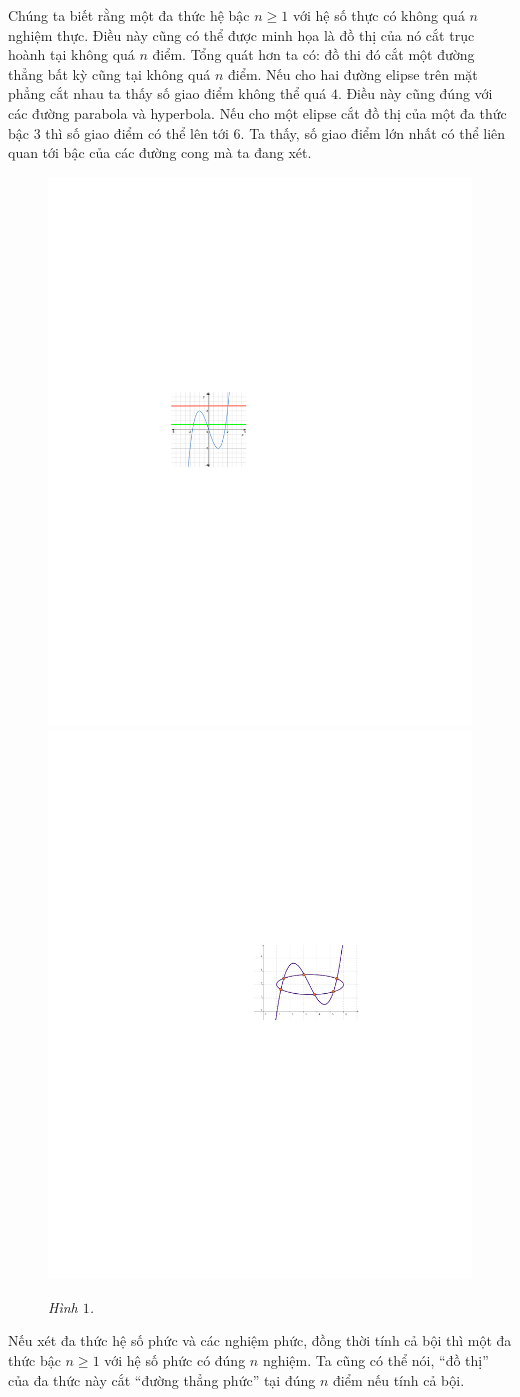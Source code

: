 \begin{multicols}{2}	
	Chúng ta biết rằng một đa thức hệ bậc $n\geq 1$ với hệ số thực có không quá $n$ nghiệm thực. Điều này cũng có thể được minh họa là đồ thị của nó cắt trục hoành tại không quá $n$ điểm. Tổng quát hơn ta có: đồ thi  đó cắt một đường thẳng bất kỳ cũng tại không quá $n$ điểm. 
	\vskip 0.1cm
	Nếu cho hai đường elipse trên mặt phẳng cắt nhau ta thấy số giao điểm không thể quá $4$. Điều này cũng đúng với các đường parabola và hyperbola.
	\vskip 0.1cm
	Nếu cho một elipse cắt đồ thị của một đa thức bậc $3$ thì số giao điểm có thể lên tới $6$. Ta thấy, số giao điểm lớn nhất có thể liên quan tới bậc của các đường cong mà ta đang xét.
	\begin{figure}[H]
		\vspace*{-5pt}
		\centering
		\captionsetup{labelformat= empty, justification=centering}
		\includegraphics[width= 0.4\linewidth]{1}
		\includegraphics[width= 0.4\linewidth]{2}
		\caption{\small\textit{\color{duongvaotoanhoc}Hình $1$.}}
		\vspace*{-10pt}
	\end{figure} 
	Nếu xét đa thức hệ số phức và các nghiệm phức, đồng thời tính cả bội thì một đa thức bậc $n\geq 1$ với hệ số phức có đúng $n$ nghiệm. Ta cũng có thể nói, ``đồ thị'' của đa thức này cắt ``đường thẳng phức'' tại đúng $n$ điểm nếu tính cả bội.

\end{multicols}
